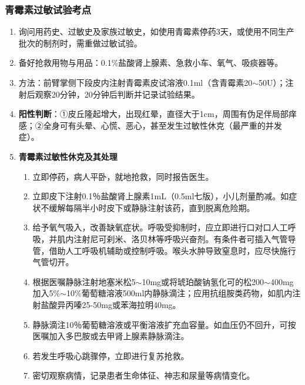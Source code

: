 \documentclass[11pt, a4paper]{ctexart}
\begin{document}
\subsubsection{青霉素过敏试验考点}
\begin{enumerate}
	\item 询问用药史、过敏史及家族过敏史，如使用青霉素停药3天，或使用不同生产批次的制剂时，需重做过敏试验。
	\item 备好抢救用物与用品：0.1\%盐酸肾上腺素、急救小车、氧气、吸痰器等。
	\item 方法：前臂掌侧下段皮内注射青霉素皮试溶液0.1ml（含青霉素20$\sim$50U）；注射后观察20分钟，20分钟后判断并记录试验结果。
	\item \textbf{阳性判断}：①皮丘隆起增大，出现红晕，直径大于1cm，周围有伪足伴局部痒感；②全身可有头晕、心慌、恶心，甚至发生过敏性休克（最严重的并发症）。
	\item \textbf{青霉素过敏性休克及其处理}
	      \begin{enumerate}
		      \item 立即停药，病人平卧，就地抢救，同时报告医生。
		      \item 立即皮下注射0.1％盐酸肾上腺素1mL（0.5ml七版），小儿剂量酌减。如症状不缓解每隔半小时皮下或静脉注射该药，直到脱离危险期。
		      \item 给予氧气吸入，改善缺氧症状。呼吸受抑制时，应立即进行口对口人工呼吸，并肌内注射尼可刹米、洛贝林等呼吸兴奋剂。有条件者可插入气管导管，借助人工呼吸机辅助或控制呼吸。喉头水肿导致窒息时，应尽快施行气管切开。
		      \item 根据医嘱静脉注射地塞米松5$\sim$10mg或将琥珀酸钠氢化可的松200$\sim$400mg加入5\%$\sim$10\%葡萄糖溶液500ml内静脉滴注；应用抗组胺类药物，如肌内注射盐酸异丙嗪25-50mg或苯海拉明40mg。
		      \item 静脉滴注10％葡萄糖溶液或平衡溶液扩充血容量。如血压仍不回升，可按医嘱加入多巴胺或去甲肾上腺素静脉滴注。
		      \item 若发生呼吸心跳骤停，立即进行复苏抢救。
		      \item 密切观察病情，记录患者生命体征、神志和尿量等病情变化。
	      \end{enumerate}
\end{enumerate}
\end{document}
